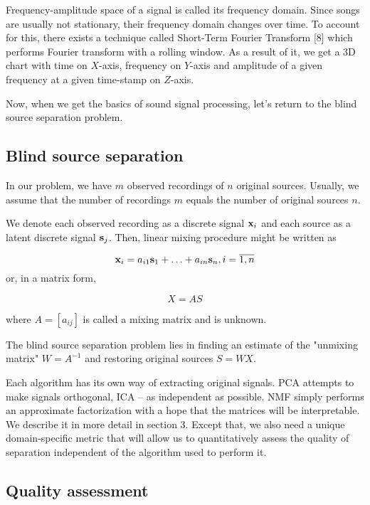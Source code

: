 \documentclass[../main.tex]{subfiles} %
\begin{document}
Frequency-amplitude space of a signal is called its frequency domain. Since songs are usually not stationary, their frequency domain changes over time. To account for this, there exists a technique called Short-Term Fourier Transform [8] which performs Fourier transform with a rolling window. As a result of it, we get a 3D chart with time on $X$-axis, frequency on $Y$-axis and amplitude of a given frequency at a given time-stamp on $Z$-axis.

Now, when we get the basics of sound signal processing, let's return to the blind source separation problem.

\subsection{Blind source separation}

In our problem, we have $m$ observed recordings of $n$ original sources. Usually, we assume that the number of recordings $m$ equals the number of original sources $n$.

We denote each observed recording as a discrete signal ${\mathbf x}_i$ and each source as a latent discrete signal ${\mathbf s}_j$. Then, linear mixing procedure might be written as

\begin{equation}
{\mathbf x}_i = a_{i1} {\mathbf s}_1 + \ldots + a_{in} {\mathbf s}_n, i = \overline{1, n}
\end{equation}
or, in a matrix form,

\begin{equation}
X = A S
\end{equation}

where $A = \left[a_{ij} \right]$ is called a mixing matrix and is unknown. 

The blind source separation problem lies in finding an estimate of the "unmixing matrix" $W = A^{-1}$  and restoring original sources $S = W X$. 

Each algorithm has its own way of extracting original signals. PCA attempts to make signals orthogonal, ICA -- as independent as possible. NMF simply performs an approximate factorization with a hope that the matrices will be interpretable. We describe it in more detail in section 3. Except that, we also need a unique domain-specific metric that will allow us to quantitatively assess the quality of separation independent of the algorithm used to perform it.

\subsection{Quality assessment}




\end{document}
